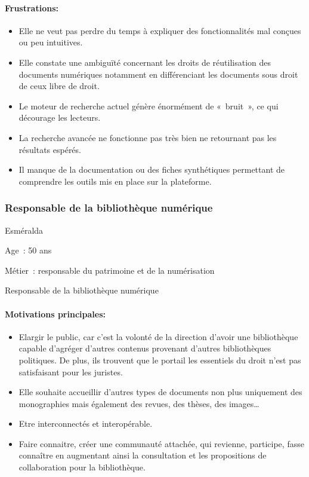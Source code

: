 \paragraph*{Frustrations:}
\begin{itemize}
	\item Elle ne veut pas perdre du temps à expliquer des fonctionnalités mal conçues ou peu intuitives.
\item Elle constate une ambiguïté concernant les droits de réutilisation des documents numériques notamment en différenciant les documents sous droit de ceux libre de droit.
\item Le moteur de recherche actuel génère énormément de « bruit », ce qui décourage les lecteurs.
\item La recherche avancée ne fonctionne pas très bien ne retournant pas les résultats espérés. 
\item Il manque de la documentation ou des fiches synthétiques permettant de comprendre les outils mis en place sur la plateforme.
\end{itemize}

\subsubsection*{Responsable de la bibliothèque numérique}
Esméralda

Age :  50 ans

Métier : responsable du patrimoine et de la numérisation

Responsable de la bibliothèque numérique

\paragraph*{Motivations principales:}
\begin{itemize}
	\item Elargir le public, car c’est la volonté de la direction d’avoir une bibliothèque capable d’agréger d’autres contenus provenant d’autres bibliothèques politiques. De plus, ils trouvent que le portail les essentiels du droit n’est pas satisfaisant pour les juristes. 
\item Elle souhaite accueillir d’autres types de documents non plus uniquement des monographies mais également des revues, des thèses, des images…
\item Etre interconnectés et interopérable.
\item Faire connaitre, créer une communauté attachée, qui revienne, participe, fasse connaître en augmentant ainsi la consultation et les propositions de collaboration pour la bibliothèque. 
\end{itemize}
